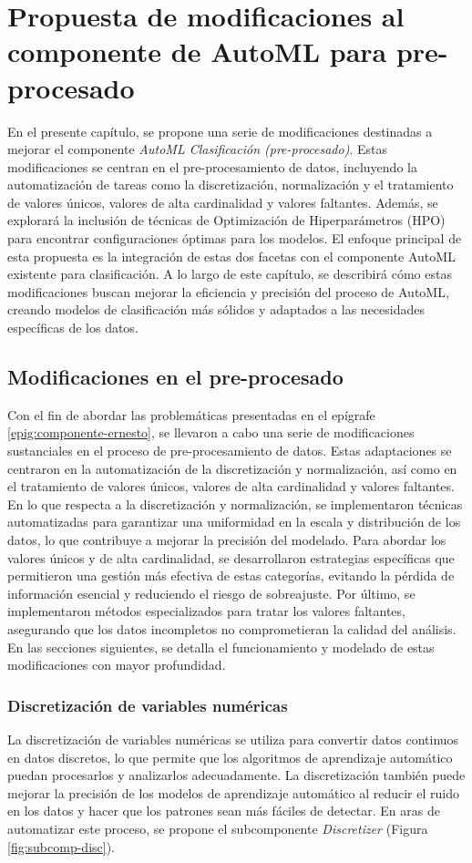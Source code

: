\chapter{Propuesta de modificaciones al componente de AutoML para pre-procesado}\label{chap:2}
En el presente capítulo, se propone una serie de modificaciones destinadas a mejorar el componente \emph{AutoML Clasificación (pre-procesado)}. Estas modificaciones se centran en el pre-procesamiento de datos, incluyendo la automatización de tareas como la discretización, normalización y el tratamiento de valores únicos, valores de alta cardinalidad y valores faltantes. Además, se explorará la inclusión de técnicas de Optimización de Hiperparámetros (HPO) para encontrar configuraciones óptimas para los modelos. El enfoque principal de esta propuesta es la integración de estas dos facetas con el componente AutoML existente para clasificación. A lo largo de este capítulo, se describirá cómo estas modificaciones buscan mejorar la eficiencia y precisión del proceso de AutoML, creando modelos de clasificación más sólidos y adaptados a las necesidades específicas de los datos.

\section{Modificaciones en el pre-procesado}
Con el fin de abordar las problemáticas presentadas en el epígrafe \ref{epig:componente-ernesto}, se llevaron a cabo una serie de modificaciones sustanciales en el proceso de pre-procesamiento de datos. Estas adaptaciones se centraron en la automatización de la discretización y normalización, así como en el tratamiento de valores únicos, valores de alta cardinalidad y valores faltantes. En lo que respecta a la discretización y normalización, se implementaron técnicas automatizadas para garantizar una uniformidad en la escala y distribución de los datos, lo que contribuye a mejorar la precisión del modelado. Para abordar los valores únicos y de alta cardinalidad, se desarrollaron estrategias específicas que permitieron una gestión más efectiva de estas categorías, evitando la pérdida de información esencial y reduciendo el riesgo de sobreajuste. Por último, se implementaron métodos especializados para tratar los valores faltantes, asegurando que los datos incompletos no comprometieran la calidad del análisis. En las secciones siguientes, se detalla el funcionamiento y modelado de estas modificaciones con mayor profundidad.


\subsection{Discretización de variables numéricas} 
La discretización de variables numéricas se utiliza para convertir datos continuos en datos discretos, lo que permite que los algoritmos de aprendizaje automático puedan procesarlos y analizarlos adecuadamente. La discretización también puede mejorar la precisión de los modelos de aprendizaje automático al reducir el ruido en los datos y hacer que los patrones sean más fáciles de detectar. En aras de automatizar este proceso, se propone el subcomponente \textit{Discretizer} (Figura \ref{fig:subcomp-disc}).

